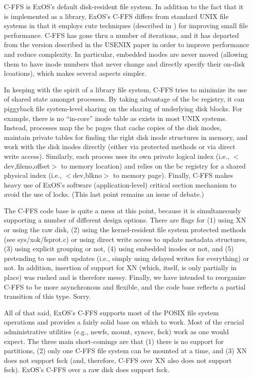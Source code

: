 
C-FFS is ExOS's default disk-resident file system.  In addition to the
fact that it is implemented as a library, ExOS's C-FFS differs from standard
UNIX file systems in that it employs cute techniques (described in
\cite{Ganger97}) for improving small file performance.  C-FFS has gone
thru a number of iterations, and it has departed from the version described
in the USENIX paper in order to improve performance and reduce complexity.
In particular, embedded inodes are never moved (allowing them to have
inode numbers that never change and directly specify their on-disk lcoations),
which makes several aspects simpler. 

In keeping with the spirit of a library file system, C-FFS tries to minimize
its use of shared state amongst processes.  By taking advantage of the
bc registry, it can piggyback file system-level sharing on the sharing of
underlying disk blocks.  For example, there is no ``in-core'' inode table
as exists in most UNIX systems.  Instead, processes map the bc pages that
cache copies of the disk inodes, maintain private tables for finding the
right disk inode structures in memory, and work with the disk inodes
directly (either via protected methods or via direct write access).
Similarly, each process uses its own private logical index
(i.e., $<$dev,fileno,offset$>$ to memory location) and relies on the
bc registry for a shared physical index (i.e., $<$dev,blkno$>$ to
memory page).  Finally, C-FFS makes heavy use of ExOS's
software (application-level) critical section mechanism to avoid the use
of locks.  (This last point remains an issue of debate.)

The C-FFS code base is quite a mess at this point, because it is simultaneously
supporting a number of different design options.  There are flags for
(1) using XN or using the raw disk,
(2) using the kernel-resident file system protected methods
(see sys/xok/fsprot.c) or using direct write access to update metadata
structures,
(3) using explicit grouping or not,
(4) using embedded inodes or not, and
(5) pretending to use soft updates (i.e., simply using delayed writes for
everything) or not.
In addition, insertion of support for XN (which, itself, is only partially
in place) was rushed and is therefore messy.
Finally, we have intended to reorganize C-FFS to be more asynchronous and
flexible, and the code base reflects a partial transition of this type.
Sorry.

All of that said, ExOS's C-FFS supports most of the POSIX file system
operations and provides a fairly solid base on which to work.  Most of
the crucial administrative utilities (e.g., newfs, mount, syncer, fsck)
work as one would expect.  The three main short-comings are that
(1) there is no support for partitions,
(2) only one C-FFS file system can be mounted at a time, and
(3) XN does not support fsck (and, therefore, C-FFS over XN also does not
support fsck).  ExOS's C-FFS over a raw disk does support fsck.

